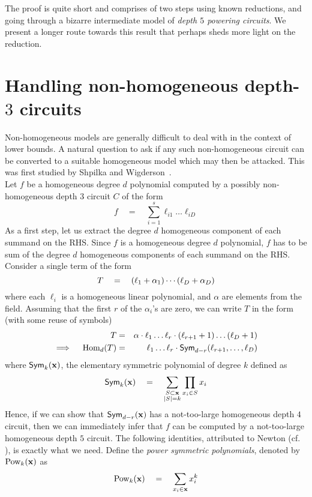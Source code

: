 The proof is quite short and comprises of two steps using known reductions, and going through a bizarre intermediate model of \emph{depth $5$ powering circuits}.
We present a longer route towards this result that perhaps sheds more light on the reduction.

\section{Handling non-homogeneous depth-$3$ circuits}\label{sec:non-hom-d3}

Non-homogeneous models are generally difficult to deal with in the
context of lower bounds.
A natural question to ask if any such non-homogeneous circuit can be
converted to a suitable homogeneous model which may then be attacked.
This was first studied by Shpilka and Wigderson~\cite{sw2001}. \\

Let $f$ be a homogeneous degree $d$ polynomial computed by a possibly
non-homogeneous depth $3$ circuit $C$ of the form
\[
f\quad=\quad \sum_{i=1}^s \ell_{i1}\dots \ell_{iD}
\]
As a first step, let us extract the degree $d$ homogeneous component
of each summand on the RHS.
Since $f$ is a homogeneous degree $d$ polynomial, $f$ has to be sum of
the degree $d$ homogeneous components of each summand on the RHS.
Consider a single term of the form
\[
T \quad = \quad (\ell_1 + \alpha_1)\cdots (\ell_D + \alpha_D)
\]
where each $\ell_i$ is a homogeneous linear polynomial, and $\alpha$
are elements from the field.
Assuming that the first $r$ of the $\alpha_i$'s are zero, we can write
$T$ in the form (with some reuse of symbols)
\begin{eqnarray*}
T & = &  \alpha \cdot \ell_1\dots \ell_r \cdot (\ell_{r+1} + 1)\dots (\ell_D+1)\\
\implies \quad \mathrm{Hom}_d(T) & = & \ell_1 \dots \ell_r \cdot \operatorname{\mathsf{Sym}}_{d-r}(\ell_{r+1}, \dots, \ell_D)
\end{eqnarray*}
where $\operatorname{\mathsf{Sym}}_{k}(\mathbf{x})$, the elementary symmetric polynomial of
degree $k$ defined as
\[
\operatorname{\mathsf{Sym}}_k(\mathbf{x}) \quad = \quad \sum_{\substack{S\subset \mathbf{x}\\|S| = k}} \prod_{x_i\in S}x_i
\]
Hence, if we can show that $\operatorname{\mathsf{Sym}}_{d-r}(\mathbf{x})$ has a not-too-large
homogeneous depth $4$ circuit, then we can immediately infer that $f$
can be computed by a not-too-large homogeneous depth $5$ circuit.
The following identities, attributed to Newton (cf. \cite{kalman00}),
is exactly what we need.
Define the \emph{power symmetric polynomials}, denoted by
$\mathrm{Pow}_k(\mathbf{x})$ as
\[
\mathrm{Pow}_k(\mathbf{x}) \quad = \quad \sum_{x_i \in \mathbf{x}} x_i^k
\]

